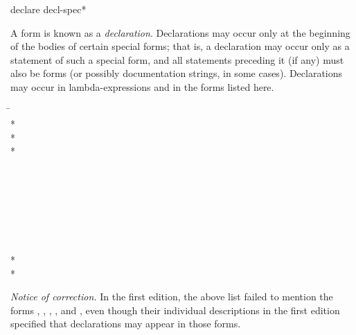 \begin{defspec}
declare {decl-spec}*

A  form is known as a \emph{declaration}.
Declarations may occur only at the beginning of the bodies of
certain special forms;
that is, a declaration may occur only as a statement
of such a special form, and all statements preceding it (if any) must
also be  forms (or possibly documentation strings, in some cases).
Declarations may occur in lambda-expressions and in the forms listed here.
\begin{lisp}
\hskip 12pc\=\kill
{}\> \\*
\> \\*
\> \\*
\> \\
\> \\
\> \\
\> \\
\> \\
\> \\
\> \\
\> \\*
\> \\*
\end{lisp}
\begin{new}%
\emph{Notice of correction.}
In the first edition, the above list failed to mention the forms
, , ,
, and , even though
their individual descriptions in the first edition specified that declarations
may appear in those forms.
\end{new}


\end{defspec}
